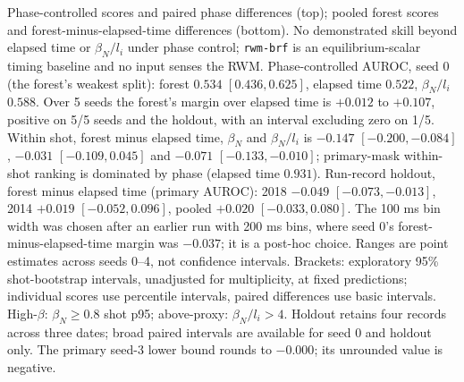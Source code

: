 \begin{table}[t]
\caption{Phase-controlled scores and paired phase differences (top); pooled forest scores and forest-minus-elapsed-time differences (bottom). No demonstrated skill beyond elapsed time or $\beta_N/l_i$ under phase control; \texttt{rwm-brf} is an equilibrium-scalar timing baseline and no input senses the RWM. Phase-controlled AUROC, seed 0 (the forest's weakest split): forest $0.534$ $[0.436, 0.625]$, elapsed time $0.522$, $\beta_N/l_i$ $0.588$. Over 5 seeds the forest's margin over elapsed time is $+0.012$ to $+0.107$, positive on 5/5 seeds and the holdout, with an interval excluding zero on 1/5. Within shot, forest minus elapsed time, $\beta_N$ and $\beta_N/l_i$ is $-0.147$ $[-0.200, -0.084]$, $-0.031$ $[-0.109, 0.045]$ and $-0.071$ $[-0.133, -0.010]$; primary-mask within-shot ranking is dominated by phase (elapsed time $0.931$). Run-record holdout, forest minus elapsed time (primary AUROC): 2018 $-0.049$ $[-0.073, -0.013]$, 2014 $+0.019$ $[-0.052, 0.096]$, pooled $+0.020$ $[-0.033, 0.080]$. The 100 ms bin width was chosen after an earlier run with 200 ms bins, where seed 0's forest-minus-elapsed-time margin was $-0.037$; it is a post-hoc choice. Ranges are point estimates across seeds 0--4, not confidence intervals. Brackets: exploratory 95\% shot-bootstrap intervals, unadjusted for multiplicity, at fixed predictions; individual scores use percentile intervals, paired differences use basic intervals. High-$\beta$: $\beta_N\geq0.8$ shot p95; above-proxy: $\beta_N/l_i>4$. Holdout retains four records across three dates; broad paired intervals are available for seed 0 and holdout only. The primary seed-3 lower bound rounds to $-0.000$; its unrounded value is negative.}
\end{table}

